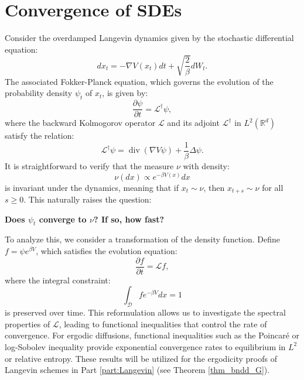 \documentclass[11pt, twoside]{report}
\begin{document}
\section{Convergence of SDEs}

Consider the overdamped Langevin dynamics given by the stochastic differential equation:
\begin{equation}
dx_t = -\nabla V(x_t) dt + \sqrt{\frac{2}{\beta}} dW_t.
\end{equation}
The associated Fokker-Planck equation, which governs the evolution of the probability density $\psi_t$ of $x_t$, is given by:
\begin{equation}
\frac{\partial \psi}{\partial t} = \mathcal{L}^{\dagger} \psi,
\end{equation}
where the backward Kolmogorov operator $\mathcal{L}$ and its adjoint $\mathcal{L}^{\dagger}$ in $L^2(\mathbb{R}^d)$ satisfy the relation:
\begin{equation}
\mathcal{L}^{\dagger} \psi = \operatorname{div} (\nabla V \psi) + \frac{1}{\beta} \Delta \psi.
\end{equation}
It is straightforward to verify that the measure $\nu$ with density:
\begin{equation}
\nu(dx) \propto e^{-\beta V(x)} dx
\end{equation}
is invariant under the dynamics, meaning that if $x_t \sim \nu$, then $x_{t+s} \sim \nu$ for all $s \geq 0$. This naturally raises the question:

\begin{center}
\textbf{Does $\psi_t$ converge to $\nu$? If so, how fast?}
\end{center}

To analyze this, we consider a transformation of the density function. Define $f = \psi e^{\beta V}$, which satisfies the evolution equation:
\begin{equation}
\frac{\partial f}{\partial t} = \mathcal{L} f,
\end{equation}
where the integral constraint:
\begin{equation} \label{FP_reform}
\int_{\mathcal{D}} f e^{-\beta V} dx = 1
\end{equation}
is preserved over time. This reformulation allows us to investigate the spectral properties of $\mathcal{L}$, leading to functional inequalities that control the rate of convergence. For ergodic diffusions, functional inequalities such as the Poincar\'{e} or log-Sobolev inequality provide exponential convergence rates to equilibrium in $L^2$ or relative entropy. These results will be utilized for the ergodicity proofs of Langevin schemes in Part \ref{part:Langevin} (see Theorem \ref{thm_bndd_G}).
\end{document}
